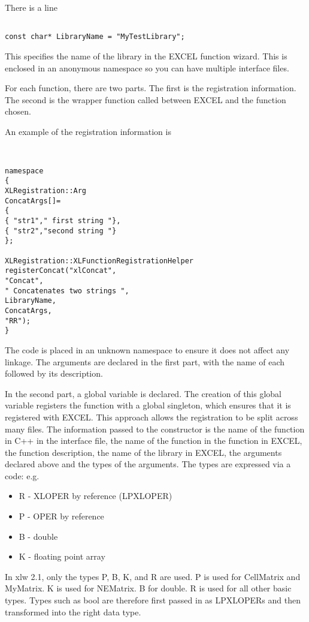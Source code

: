\documentclass[12pt,reqno]{amsart}
\numberwithin{equation}{section}
\numberwithin{figure}{section}
\begin{document}
There is a line
\begin{verbatim}

const char* LibraryName = "MyTestLibrary";

\end{verbatim}
This specifies the name of the library in the EXCEL function
wizard. This is enclosed in an anonymous namespace so you can have
multiple interface files. 

For each function, there are two parts. The first is the registration
information. The second is the wrapper function called between EXCEL
and the function chosen. 

An example of the registration information is 
\begin{verbatim}


namespace
{
XLRegistration::Arg
ConcatArgs[]=
{
{ "str1"," first string "},
{ "str2","second string "}
};
  
XLRegistration::XLFunctionRegistrationHelper
registerConcat("xlConcat",
"Concat",
" Concatenates two strings ",
LibraryName,
ConcatArgs,
"RR");
}

\end{verbatim}

The code is placed in an unknown namespace to ensure it does not
affect any linkage. The arguments are declared in the first part, with
the name of each followed by its description. 

In the second part, a global variable is declared. The creation of
this global variable registers the function with a global singleton,
which ensures that it is registered with EXCEL. This approach allows
the registration to be split across many files. The information passed
to the constructor is the name of the function in C++ in the interface
file, the name of the function in the function in EXCEL, the function
description, the name of the library in EXCEL, the arguments declared
above and the types of the arguments. The types are expressed via a
code: e.g. 
\begin{itemize}
\item R - XLOPER by reference (LPXLOPER)
\item P - OPER by reference
\item B - double
\item K - floating point array
\end{itemize}

In xlw 2.1, only the types P, B, K, and R are used. P is used for CellMatrix
and MyMatrix. K is used for NEMatrix. B for double. 
R is used for all other basic types. Types such as bool 
are therefore first passed in as LPXLOPERs and then transformed
into the right data type. 
\end{document}
